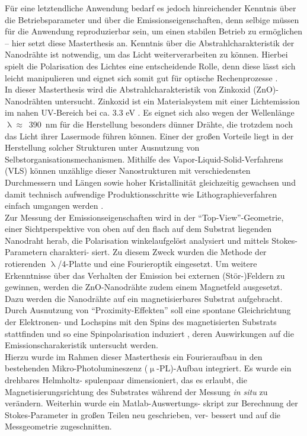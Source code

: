 Für eine letztendliche Anwendung bedarf es jedoch hinreichender Kenntnis über die Betriebsparameter und über die Emissionseigenschaften, denn selbige müssen für die Anwendung reproduzierbar sein, um einen stabilen Betrieb zu ermöglichen – hier setzt diese Masterthesis an. Kenntnis über die Abstrahlcharakteristik der Nanodrähte ist notwendig, um das Licht weiterverarbeiten zu können. Hierbei spielt die Polarisation des Lichtes eine entscheidende Rolle, denn diese lässt sich leicht manipulieren und eignet sich somit gut für optische Rechenprozesse \cite{Lohmann.1986}.\\
In dieser Masterthesis wird die Abstrahlcharakteristik von Zinkoxid (ZnO)-Nanodrähten untersucht. Zinkoxid ist ein Materialsystem mit einer Lichtemission im nahen UV-Bereich bei ca. 3.3 eV \cite{Srikant.1998}. Es eignet sich also wegen der Wellenlänge \mbox{$\uplambda\approx$ 390 nm} für die Herstellung besonders dünner Drähte, die trotzdem noch das Licht ihrer Lasermode führen können. Einer der großen Vorteile liegt in der Herstellung solcher Strukturen unter Ausnutzung von Selbstorganisationsmechanismen. Mithilfe des Vapor-Liquid-Solid-Verfahrens (VLS) können unzählige dieser Nanostrukturen mit verschiedensten Durchmessern und Längen sowie hoher Kristallinität gleichzeitig gewachsen und damit technisch aufwendige Produktionsschritte wie Lithographieverfahren einfach \mbox{umgangen} werden \cite{Roeder.Diss}.\\
Zur Messung der Emissionseigenschaften wird in der ``Top-View''-Geometrie, einer Sichtperspektive von oben auf den flach auf dem Substrat liegenden Nanodraht herab, die Polarisation winkelaufgelöst analysiert und mittels Stokes-Parametern charakteri- siert. Zu diesem Zweck wurden die Methode der rotierenden $\uplambda$/4-Platte und eine Fourieroptik eingesetzt. Um weitere Erkenntnisse über das Verhalten der Emission bei externen (Stör-)Feldern zu gewinnen, werden die ZnO-Nanodrähte zudem einem Magnetfeld ausgesetzt. Dazu werden die Nanodrähte auf ein magnetisierbares Substrat \mbox{aufgebracht}. Durch Ausnutzung von ``Proximity-Effekten'' soll eine spontane Gleichrichtung der Elektronen- und Lochspins mit den Spins des \mbox{magnetisierten} Substrats stattfinden und so eine Spinpolarisation induziert \cite{Epstein.2002}, deren Auswirkungen auf die Emissionscharakeristik untersucht werden.\\
Hierzu wurde im Rahmen dieser Masterthesis ein Fourieraufbau in den \mbox{bestehenden} Mikro-Photolumineszenz ($\upmu$-PL)-Aufbau integriert. Es wurde ein drehbares Helmholtz- spulenpaar dimensioniert, das es erlaubt, die Magnetisierungsrichtung des Substrates während der Messung \textit{in situ} zu verändern. Weiterhin wurde ein Matlab-Auswertungs- skript zur Berechnung der Stokes-Parameter in großen Teilen neu geschrieben, ver- bessert und auf die Messgeometrie zugeschnitten.    
